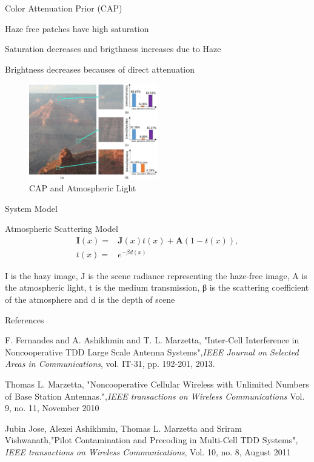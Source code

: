 \documentclass{beamer}
\begin{document}
\begin{frame}[t]{Color Attenuation Prior (CAP)}
\item{Haze free patches have high saturation}
\item{Saturation decreases and brigthness increases due to Haze}
\item{Brightness decreases becauses of direct attenuation}
\begin{figure}[htbp!]
    \centering
    \includegraphics[width=0.5\textwidth]{figures/cap.pdf}
    \caption{CAP and Atmospheric Light}
\end{figure}

\end{frame}
\begin{frame}[t]{System Model}
\item{Atmospheric Scattering Model}
\begin{align} {{\mathbf{I}}}(x)=&{{\mathbf{J}}}(x)t(x)+{{\mathbf{A}}}(1-t(x)),
 \\ t(x)=&e^{-\beta d(x)} 
\end{align}

\item{I is the hazy image, J is the scene radiance representing the haze-free image, A is the atmospheric light, t is the medium transmission, β is the scattering coefficient of the atmosphere and d is the depth of scene}

\end{frame}

\begin{frame}[t]{References}
\vspace{0.6cm}

\begin{thebibliography}{5}
F. Fernandes and A. Ashikhmin and T. L. Marzetta, "Inter-Cell Interference in Noncooperative TDD Large Scale Antenna Systems",\textit{IEEE Journal on Selected Areas in Communications}, vol. IT-31, pp. 192-201, 2013.

Thomas L. Marzetta, "Noncooperative Cellular Wireless with
Unlimited Numbers of Base Station Antennas.",\textit{IEEE transactions on Wireless Communications}  Vol. 9, no. 11, November 2010

Jubin Jose, Alexei Ashikhmin, Thomas L. Marzetta and Sriram Vishwanath,"Pilot Contamination and Precoding in
Multi-Cell TDD Systems", \textit{
IEEE transactions on Wireless Communications}, Vol. 10, no. 8, August 2011

\end{thebibliography} 

\end{frame}
\end{document}
